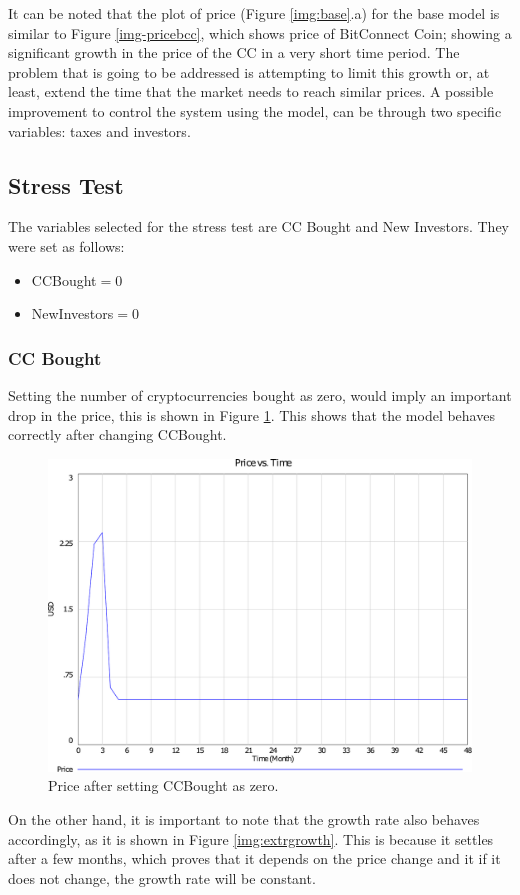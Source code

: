    It can be noted that the plot of price (Figure \ref{img:base}.a) for the base model is similar to Figure \ref{img-pricebcc}, which shows price of BitConnect Coin; showing a significant growth in the price of the CC in a very short time period. The problem that is going to be addressed is attempting to limit this growth or, at least, extend the time that the market needs to reach similar prices. A possible improvement to control the system using the model, can be through two specific variables: taxes and investors. 
   
\subsection{Stress Test}
	The variables selected for the stress test are CC Bought and New Investors. They were set as follows:
	\begin{multicols}{2}
    \begin{itemize}
    \item CCBought$=0$
    \columnbreak 
    \item NewInvestors$=0$
    \end{itemize}
		
	\end{multicols}
	
	\subsubsection{CC Bought}
		Setting the number of cryptocurrencies bought as zero, would imply an important drop in the price, this is shown in Figure \ref{img:extrprice}. This shows that the model behaves correctly after changing CCBought. 
        \begin{figure}[H]
        	\centering
            \includegraphics[scale=0.3]{files/ExtrPrice.pdf}
            \caption{Price after setting CCBought as zero.}
            \label{img:extrprice}
        \end{figure}
        On the other hand, it is important to note that the growth rate also behaves accordingly, as it is shown in Figure \ref{img:extrgrowth}. This is because it settles after a few months, which proves that it depends on the price change and it if it does not change, the growth rate will be constant.
        
